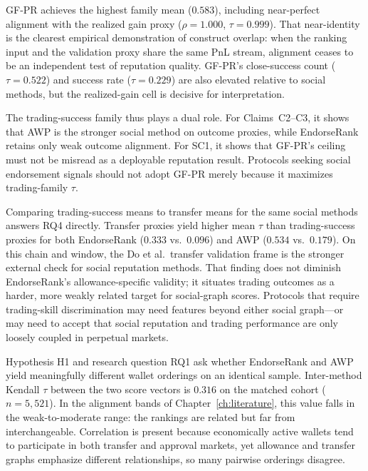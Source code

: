 GF-PR achieves the highest family mean ($0.583$), including near-perfect alignment with the realized gain proxy ($\rho=1.000$, $\tau=0.999$). That near-identity is the clearest empirical demonstration of construct overlap: when the ranking input and the validation proxy share the same PnL stream, alignment ceases to be an independent test of reputation quality. GF-PR's close-success count ($\tau=0.522$) and success rate ($\tau=0.229$) are also elevated relative to social methods, but the realized-gain cell is decisive for interpretation.

The trading-success family thus plays a dual role. For Claims~C2--C3, it shows that AWP is the stronger social method on outcome proxies, while EndorseRank retains only weak outcome alignment. For SC1, it shows that GF-PR's ceiling must not be misread as a deployable reputation result. Protocols seeking social endorsement signals should not adopt GF-PR merely because it maximizes trading-family $\tau$.

Comparing trading-success means to transfer means for the same social methods answers RQ4 directly. Transfer proxies yield higher mean $\tau$ than trading-success proxies for both EndorseRank ($0.333$ vs.\ $0.096$) and AWP ($0.534$ vs.\ $0.179$). On this chain and window, the Do et al.\ transfer validation frame is the stronger external check for social reputation methods. That finding does not diminish EndorseRank's allowance-specific validity; it situates trading outcomes as a harder, more weakly related target for social-graph scores. Protocols that require trading-skill discrimination may need features beyond either social graph---or may need to accept that social reputation and trading performance are only loosely coupled in perpetual markets.


Hypothesis H1 and research question RQ1 ask whether EndorseRank and AWP yield meaningfully different wallet orderings on an identical sample. Inter-method Kendall $\tau$ between the two score vectors is $0.316$ on the matched cohort ($n=5{,}521$). In the alignment bands of Chapter~\ref{ch:literature}, this value falls in the weak-to-moderate range: the rankings are related but far from interchangeable. Correlation is present because economically active wallets tend to participate in both transfer and approval markets, yet allowance and transfer graphs emphasize different relationships, so many pairwise orderings disagree.

